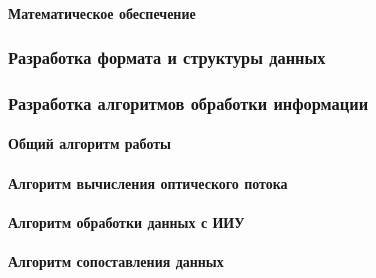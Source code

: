 \paragraph{Математическое обеспечение}

\subsubsection{Разработка формата и структуры данных}

\subsubsection{Разработка алгоритмов обработки информации}
\paragraph{Общий алгоритм работы}
\paragraph{Алгоритм вычисления оптического потока}
\paragraph{Алгоритм обработки данных с ИИУ}
\paragraph{Алгоритм сопоставления данных}


